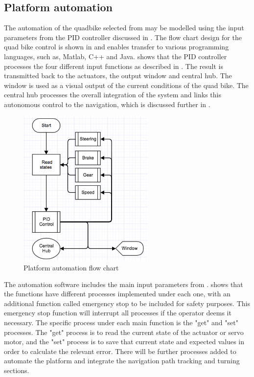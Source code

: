 \documentclass[main.tex]{subfiles}
\begin{document}
\subsection{Platform automation}
The automation of the quadbike selected from  may be modelled using the input parameters from the PID controller discussed in . The flow chart design for the quad bike control is shown in  and enables transfer to various programming languages, such as, Matlab, C++ and Java.  shows that the PID controller processes the four different input functions as described in . The result is transmitted back to the actuators, the output window and central hub. The window is used as a visual output of the current conditions of the quad bike. The central hub processes the overall integration of the system and links this autonomous control to the navigation, which is discussed further in . 

\begin{figure}[ht]
\includegraphics[width=0.6\textwidth]{3-ConceptDesign/autoflowchart.png}
\centering
\caption{Platform automation flow chart} 
\end{figure}

The automation software includes the main input parameters from .  shows that the functions have different processes implemented under each one, with an additional function called emergency stop to be included for safety purposes. This emergency stop function will interrupt all processes if the operator deems it necessary. The specific process under each main function is the "get" and "set" processes. The "get" process is to read the current state of the actuator or servo motor, and the "set" process is to save that current state and expected values in order to calculate the relevant error. There will be further processes added to automate the platform and integrate the navigation path tracking and turning sections.
\end{document}
